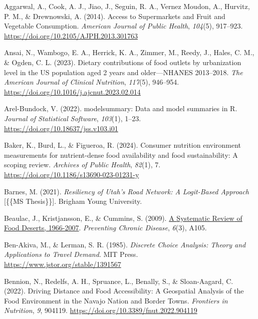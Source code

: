 \documentclass[
  letterpaper,
  number,
  review,
  3p]{elsarticle}
\newlength{\cslhangindent}
\newenvironment{CSLReferences}[2] %
 {\begin{list}{}{%
  \setlength{\itemindent}{0pt}
  \setlength{\leftmargin}{0pt}
  \setlength{\parsep}{0pt}
  \ifodd #1
   \setlength{\leftmargin}{\cslhangindent}
   \setlength{\itemindent}{-1\cslhangindent}
  \fi
  \setlength{\itemsep}{#2\baselineskip}}}
 {\end{list}}
\begin{document}
\label{refs}
\begin{CSLReferences}{1}{0}
Aggarwal, A., Cook, A. J., Jiao, J., Seguin, R. A., Vernez Moudon, A.,
Hurvitz, P. M., \& Drewnowski, A. (2014). Access to {Supermarkets} and
{Fruit} and {Vegetable Consumption}. \emph{American Journal of Public
Health}, \emph{104}(5), 917--923.
\url{https://doi.org/10.2105/AJPH.2013.301763}

Ansai, N., Wambogo, E. A., Herrick, K. A., Zimmer, M., Reedy, J., Hales,
C. M., \& Ogden, C. L. (2023). Dietary contributions of food outlets by
urbanization level in the {US} population aged 2 years and
older---{NHANES} 2013--2018. \emph{The American Journal of Clinical
Nutrition}, \emph{117}(5), 946--954.
\url{https://doi.org/10.1016/j.ajcnut.2023.02.014}

Arel-Bundock, V. (2022). {modelsummary}: Data and model summaries in
{R}. \emph{Journal of Statistical Software}, \emph{103}(1), 1--23.
\url{https://doi.org/10.18637/jss.v103.i01}

Baker, K., Burd, L., \& Figueroa, R. (2024). Consumer nutrition
environment measurements for nutrient-dense food availability and food
sustainability: A scoping review. \emph{Archives of Public Health},
\emph{82}(1), 7. \url{https://doi.org/10.1186/s13690-023-01231-y}

Barnes, M. (2021). \emph{Resiliency of {Utah}'s {Road Network}: {A
Logit-Based Approach}} {[}\{\{MS Thesis\}\}{]}. Brigham Young
University.

Beaulac, J., Kristjansson, E., \& Cummins, S. (2009).
\href{https://www.ncbi.nlm.nih.gov/pmc/articles/PMC2722409}{A
{Systematic Review} of {Food Deserts}, 1966-2007}. \emph{Preventing
Chronic Disease}, \emph{6}(3), A105.

Ben-Akiva, M., \& Lerman, S. R. (1985). \emph{Discrete {Choice
Analysis}: {Theory} and {Applications} to {Travel Demand}}. MIT Press.
\url{https://www.jstor.org/stable/1391567}

Bennion, N., Redelfs, A. H., Spruance, L., Benally, S., \& Sloan-Aagard,
C. (2022). Driving {Distance} and {Food Accessibility}: {A Geospatial
Analysis} of the {Food Environment} in the {Navajo Nation} and {Border
Towns}. \emph{Frontiers in Nutrition}, \emph{9}, 904119.
\url{https://doi.org/10.3389/fnut.2022.904119}


\end{CSLReferences}
\end{document}
